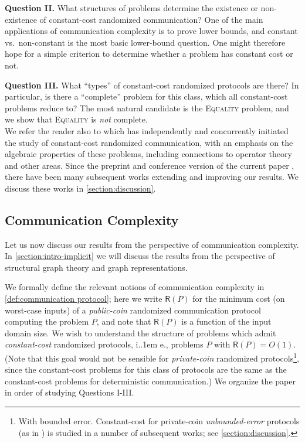 \documentclass{theoretics}
\makeatletter
\newcommand*\ie{i.\kern.1em e.\@\xspace} %
\makeatother
\begin{document}
\vspace{0.75em}\noindent\textbf{Question II.}
What structures of problems determine the existence or non-existence of constant-cost randomized
communication? One of the main applications of communication complexity is to prove lower bounds,
and constant vs.~non-constant is the most basic lower-bound question. One might therefore hope for a
simple criterion to determine whether a problem has constant cost or not.

\vspace{0.75em}\noindent\textbf{Question III.}
What ``types'' of constant-cost randomized protocols are there? In particular,
is there a ``complete'' problem for this class, which all constant-cost problems reduce to? The most
natural candidate is the \textsc{Equality} problem, and we show that \textsc{Equality} is \emph{not}
complete.\\

We refer the reader also to \cite{HHH23dimfree} which has independently and concurrently initiated
the study of constant-cost randomized communication, with an emphasis on the algebraic properties of
these problems, including connections to operator theory and other areas. Since the preprint and
conference version of the current paper \cite{HWZ22}, there have been many subsequent works
extending and improving our results. We discuss these works in \cref{section:discussion}.

\subsection{Communication Complexity}
\label{section:intro-communication}

Let us now discuss our results from the perspective of communication complexity. In
\cref{section:intro-implicit} we will discuss the results from the perspective of structural graph
theory and graph representations.

\newcommand{\R}{\mathsf{R}}
We formally define the relevant notions of communication complexity in \cref{def:communication
protocol}; here we write $\R(P)$ for the minimum cost (on worst-case inputs) of a \emph{public-coin}
randomized communication protocol computing the problem $P$, and note that $\R(P)$ is a function of
the input domain size.  We wish to understand the structure of problems which admit
\emph{constant-cost} randomized protocols, \ie, problems $P$ with $\R(P) = O(1)$. (Note that this
goal would not be sensible for \emph{private-coin} randomized protocols\footnote{With bounded error.
Constant-cost for private-coin \emph{unbounded-error} protocols (as in \cite{PS86}) is studied in a
number of subsequent works; see \cref{section:discussion}.}, since the constant-cost problems for this
class of protocols are the same as the constant-cost problems for deterministic communication.) We
organize the paper in order of studying Questions I-III.
\end{document}
